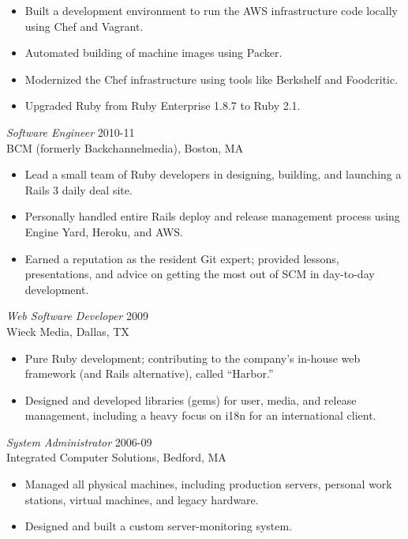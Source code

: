 \documentclass[line,margin]{res}
\begin{document}
\begin{resume}
\begin{itemize}
    \vspace{-2.5mm} %
    \begin{itemize}  \itemsep -3pt %
      \item Built a development environment to run the AWS infrastructure code locally using Chef and Vagrant.
      \item Automated building of machine images using Packer.
      \item Modernized the Chef infrastructure using tools like Berkshelf and Foodcritic.
      \item Upgraded Ruby from Ruby Enterprise 1.8.7 to Ruby 2.1.
    \end{itemize}
  \end{itemize}

  {\sl Software Engineer}  \hfill 2010-11 \\
  BCM (formerly Backchannelmedia),
  Boston, MA
  \begin{itemize}  \itemsep -2pt %
    \item Lead a small team of Ruby developers in designing, building, and launching a Rails 3 daily deal site.
    \item Personally handled entire Rails deploy and release management process using Engine Yard, Heroku, and AWS.
    \item Earned a reputation as the resident Git expert; provided lessons, presentations, and advice on getting the most out of SCM in day-to-day development.
  \end{itemize}

  {\sl Web Software Developer}  \hfill 2009 \\
  Wieck Media,
  Dallas, TX
  \begin{itemize}  \itemsep -2pt %
    \item Pure Ruby development; contributing to the company's in-house web framework (and Rails alternative), called ``Harbor.''
    \item Designed and developed libraries (gems) for user, media, and release management, including a heavy focus on i18n for an international client.
  \end{itemize}

  {\sl System Administrator}  \hfill 2006-09 \\
  Integrated Computer Solutions,
  Bedford, MA
  \begin{itemize}  \itemsep -2pt %
       \item Managed all physical machines, including production servers, personal work stations, virtual machines, and legacy hardware.
       \item Designed and built a custom server-monitoring system.
  \end{itemize}


\end{resume}
\end{document}
